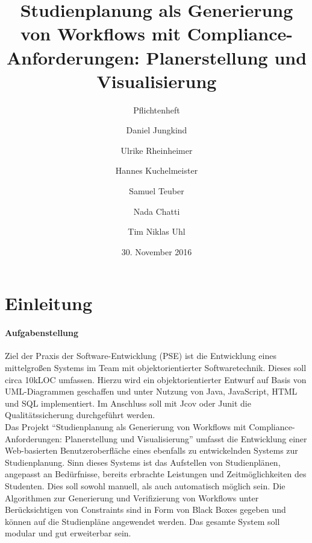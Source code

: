 \documentclass[titlepage=true, parskip=full]{scrartcl}
\title{Studienplanung als Generierung von Workflows mit Compliance-Anforderungen: Planerstellung und Visualisierung}
\subtitle{Pflichtenheft}
\author{Daniel Jungkind \and Ulrike Rheinheimer \and Hannes Kuchelmeister \and Samuel Teuber \and Nada Chatti \and Tim Niklas Uhl}
\date{30. November 2016}
\begin{document}
\maketitle
\tableofcontents
\pagebreak

%
\section{Einleitung}
\paragraph{Aufgabenstellung}
Ziel der Praxis der Software-Entwicklung (PSE) ist die Entwicklung eines mittelgroßen Systems im Team mit objektorientierter Softwaretechnik. Dieses soll circa 10kLOC umfassen. Hierzu wird ein objektorientierter Entwurf auf Basis von UML-Diagrammen geschaffen und unter Nutzung von Java, JavaScript, HTML und SQL implementiert. Im Anschluss soll mit Jcov oder Junit die Qualitätssicherung durchgeführt werden.\\
Das Projekt \enquote{Studienplanung als Generierung von Workflows mit Compliance-Anforderungen: Planerstellung und Visualisierung} umfasst die Entwicklung einer Web-basierten Benutzeroberfläche eines ebenfalls zu entwickelnden Systems zur Studienplanung. Sinn dieses Systems ist das Aufstellen von Studienplänen, angepasst an Bedürfnisse, bereits erbrachte Leistungen und Zeitmöglichkeiten des Studenten. Dies soll sowohl manuell, als auch automatisch möglich sein. Die Algorithmen zur Generierung und Verifizierung von Workflows unter Berücksichtigen von Constraints sind in Form von Black Boxes gegeben und können auf die Studienpläne angewendet werden. Das gesamte System soll modular und gut erweiterbar sein.\\
\end{document}
